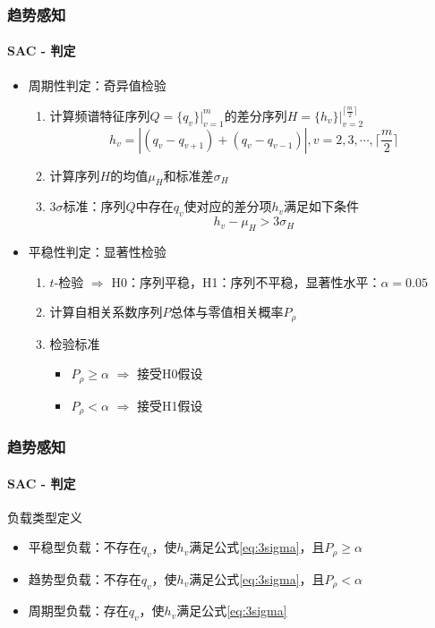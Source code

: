 \begin{frame}
\frametitle{趋势感知}
\framesubtitle{SAC - 判定}
    \begin{itemize}
        \item 周期性判定：奇异值检验
        \begin{enumerate}[1]
            \item 计算频谱特征序列$Q=\{q_v\}|^m_{v=1}$的差分序列$H = \{h_v\}|^{\lceil \frac{m}{2} \rceil}_{v=2}$
            \begin{equation}
                h_v = \left|(q_v - q_{v+1}) + (q_v - q_{v-1})\right|,v=2,3,\cdots,\lceil \frac{m}{2} \rceil
            \end{equation}
            \item 计算序列$H$的均值$\mu_H$和标准差$\sigma_H$
            \item $3\sigma$标准：序列$Q$中存在$q_v$使对应的差分项$h_v$满足如下条件
            \begin{equation}
                h_v - \mu_H > 3\sigma_H
                \label{eq:3sigma}
            \end{equation}
        \end{enumerate}
        \item 平稳性判定：显著性检验
        \begin{enumerate}[1]
            \item $t$-检验 $\Rightarrow$ H0：序列平稳，H1：序列不平稳，显著性水平：$\alpha=0.05$
            \item 计算自相关系数序列$P$总体与零值相关概率$P_\rho$
            \item 检验标准
            \begin{itemize}
                \item $P_\rho \geq \alpha$ $\Rightarrow$ 接受H0假设
                \item $P_\rho < \alpha$ $\Rightarrow$ 接受H1假设
            \end{itemize}
        \end{enumerate}
    \end{itemize}
\end{frame}

\begin{frame}
\frametitle{趋势感知}
\framesubtitle{SAC - 判定}
\begin{block}{负载类型定义}
    \begin{itemize}
        \item 平稳型负载：不存在$q_v$，使$h_v$满足公式\ref{eq:3sigma}，且$P_\rho \geq \alpha$
        \item 趋势型负载：不存在$q_v$，使$h_v$满足公式\ref{eq:3sigma}，且$P_\rho < \alpha$
        \item 周期型负载：存在$q_v$，使$h_v$满足公式\ref{eq:3sigma}
    \end{itemize}
\end{block}
\end{frame}

